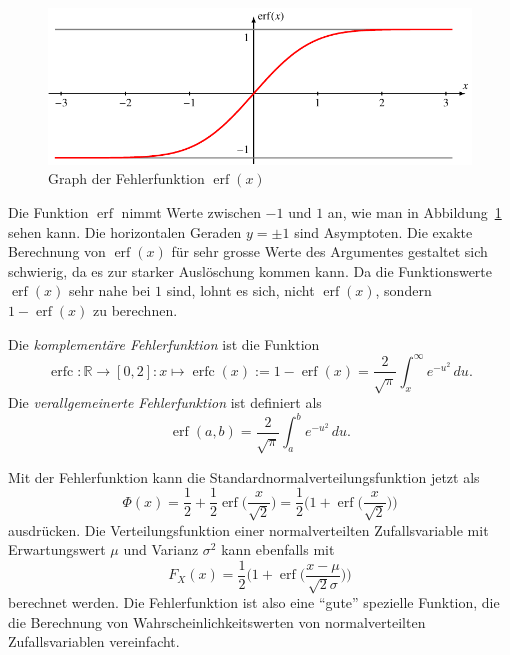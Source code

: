 \begin{figure}
\centering
\includegraphics{chapters/060-integral/images/erf.pdf}
\caption{Graph der Fehlerfunktion $\operatorname{erf}(x)$
\label{buch:integrale:fig:erf}}
\end{figure}
Die Funktion $\operatorname{erf}$ nimmt Werte zwischen $-1$ und $1$ an,
wie man in Abbildung~\ref{buch:integrale:fig:erf} sehen kann.
Die horizontalen Geraden $y=\pm 1$ sind Asymptoten.
Die exakte Berechnung von $\operatorname{erf}(x)$ für sehr grosse Werte
des Argumentes gestaltet sich schwierig, da es zur starker Auslöschung
kommen kann.
Da die Funktionswerte $\operatorname{erf}(x)$ sehr nahe bei $1$ sind,
lohnt es sich, nicht $\operatorname{erf}(x)$, sondern $1-\operatorname{erf}(x)$
zu berechnen.

\begin{definition}
Die {\em komplementäre Fehlerfunktion} ist die Funktion
\[
\operatorname{erfc}
\colon
\mathbb{R} \to [0,2]
:
x\mapsto
\operatorname{erfc}(x)
:=
1-\operatorname{erf}(x)
=
\frac{2}{\sqrt{\pi}}\int_x^\infty e^{-u^2}\,du.
\]
Die {\em verallgemeinerte Fehlerfunktion} ist definiert als
\[
\operatorname{erf}(a,b)
=
\frac{2}{\sqrt{\pi}}
\int_a^b e^{-u^2}\,du.
\]
\end{definition}

Mit der Fehlerfunktion kann die Standardnormalverteilungsfunktion jetzt
als
\[
\Phi(x)
=
\frac12
+
\frac12\operatorname{erf}\biggl( \frac{x}{\sqrt{2}} \biggr)
=
\frac12\biggl(
1+\operatorname{erf}\biggl(\frac{x}{\sqrt{2}}\biggr)\biggr)
\]
ausdrücken.
Die Verteilungsfunktion einer normalverteilten Zufallsvariable mit
Erwartungswert $\mu$ und Varianz $\sigma^2$ kann ebenfalls mit
\[
F_X(x)
=
\frac12\biggl(
1+\operatorname{erf}\biggl(\frac{x-\mu}{\sqrt{2}\sigma}\biggr)
\biggr)
\]
berechnet werden.
Die Fehlerfunktion ist also eine ``gute'' spezielle Funktion, die
die Berechnung von Wahrscheinlichkeitswerten von normalverteilten
Zufallsvariablen vereinfacht.

